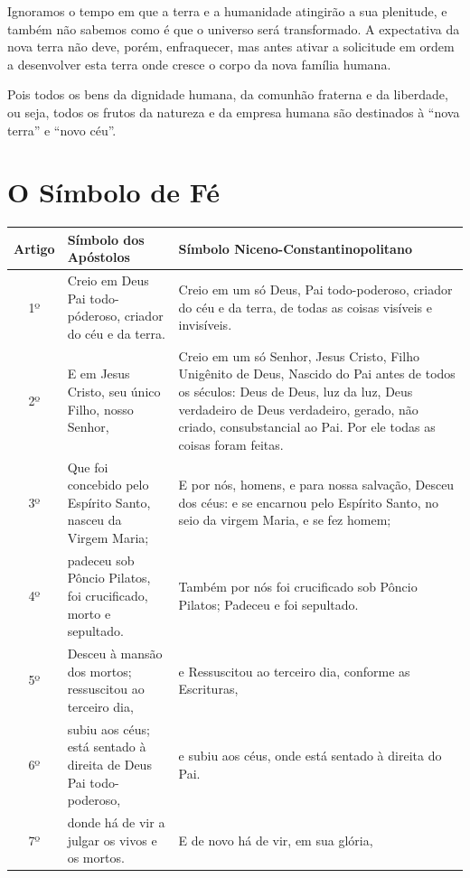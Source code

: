 Ignoramos o tempo em que a terra e a humanidade atingirão a sua plenitude, e também não sabemos como é que o universo será transformado. A expectativa da nova terra não deve, porém, enfraquecer, mas antes ativar a solicitude em ordem a desenvolver esta terra onde cresce o corpo da nova família humana.

Pois todos os bens da dignidade humana, da comunhão fraterna e da liberdade, ou seja, todos os frutos da natureza e da empresa humana são destinados à ``nova terra'' e ``novo céu''.

\clearpage

\section{O Símbolo de Fé}

\begin{tabular}{|c|p{4.5cm}|p{5.5cm}|}
    \hline
        Artigo & Símbolo dos Apóstolos & Símbolo Niceno-Constantinopolitano \\ \hline
        1º & Creio em Deus Pai todo-póderoso,
        criador do céu e da terra.
 & Creio em um só Deus, Pai todo-poderoso,
 criador do céu e da terra,
 de todas as coisas visíveis e invisíveis.
 \\ \hline
        2º & E em Jesus Cristo, seu único Filho, nosso Senhor,        
 & Creio em um só Senhor, Jesus Cristo, Filho Unigênito de Deus,
 Nascido do Pai antes de todos os séculos:
 Deus de Deus,
 luz da luz,
 Deus verdadeiro de Deus verdadeiro,
 gerado, não criado,
 consubstancial ao Pai.
 Por ele todas as coisas foram feitas.
 \\ \hline
        3º & Que foi concebido pelo Espírito Santo, nasceu da Virgem Maria; & E por nós, homens, e para nossa salvação,
        Desceu dos céus: e se encarnou pelo Espírito Santo, no seio da virgem Maria, e se fez homem; \\ \hline
        4º & padeceu sob Pôncio Pilatos,
        foi crucificado, morto e sepultado.
 & Também por nós foi crucificado sob Pôncio Pilatos;
 Padeceu e foi sepultado.
 \\ \hline
        5º & Desceu à mansão dos mortos; ressuscitou ao terceiro dia, & e Ressuscitou ao terceiro dia,
        conforme as Escrituras,
 \\ \hline
        6º & subiu aos céus;
        está sentado à direita de Deus Pai todo-poderoso,
 & e subiu aos céus,
 onde está sentado à direita do Pai.
 \\ \hline
        7º & donde há de vir a julgar os vivos e os mortos. & E de novo há de vir, em sua glória,

\end{tabular}
